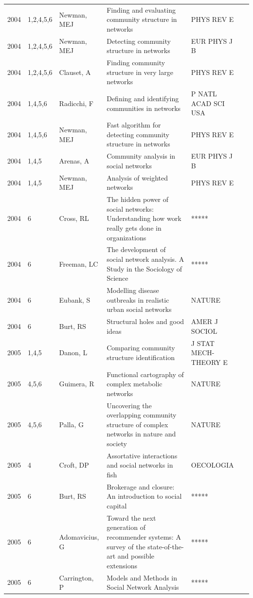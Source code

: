 \documentclass[11pt]{article} %
\begin{document}
\begin{longtable}{p{0.8cm}|p{1.25cm}|p{2.8cm}|p{7.5cm}|p{3cm}l}
2004&	1,2,4,5,6&	Newman, MEJ&	 Finding and evaluating community structure in networks&         	PHYS REV E\\
2004&	1,2,4,5,6&	Newman, MEJ&	 Detecting community structure in networks&         	EUR PHYS J B\\
2004&	1,2,4,5,6&	Clauset, A&	 Finding community structure in very large networks&         	PHYS REV E\\
2004&	1,4,5,6&	Radicchi, F&	 Defining and identifying communities in networks&         	P NATL ACAD SCI USA\\
2004&	1,4,5,6&	Newman, MEJ&	 Fast algorithm for detecting community structure in networks&         	PHYS REV E\\
2004&	1,4,5&	Arenas, A&	 Community analysis in social networks&         	EUR PHYS J B\\
2004&	1,4,5&	Newman, MEJ&	 Analysis of weighted networks&         	PHYS REV E\\
2004&	6&	Cross, RL&	 The hidden power of social networks: Understanding how work really gets done in organizations&         	*****\\
2004&	6&	Freeman, LC&	The development of social network analysis. A Study in the Sociology of Science&         	*****\\
2004&	6&	Eubank, S&	 Modelling disease outbreaks in realistic urban social networks&         	NATURE\\
2004&	6&	Burt, RS&	 Structural holes and good ideas&         	AMER J SOCIOL\\
2005&	1,4,5&	Danon, L&	 Comparing community structure identification&         	J STAT MECH-THEORY E\\
2005&	4,5,6&	Guimera, R&	 Functional cartography of complex metabolic networks&         	NATURE\\
2005&	4,5,6&	Palla, G&	 Uncovering the overlapping community structure of complex networks in nature and society&         	NATURE\\
2005&	4&	Croft, DP&	 Assortative interactions and social networks in fish&         	OECOLOGIA\\
2005&	6&	Burt, RS&	 Brokerage and closure: An introduction to social capital&         	*****\\
2005&	6&	Adomavicius, G&	 Toward the next generation of recommender systems: A survey of the state-of-the-art and possible extensions&         	*****\\
2005&	6&	Carrington, P&	Models and Methods in Social Network Analysis&         	*****\\

\end{longtable}
\end{document}
